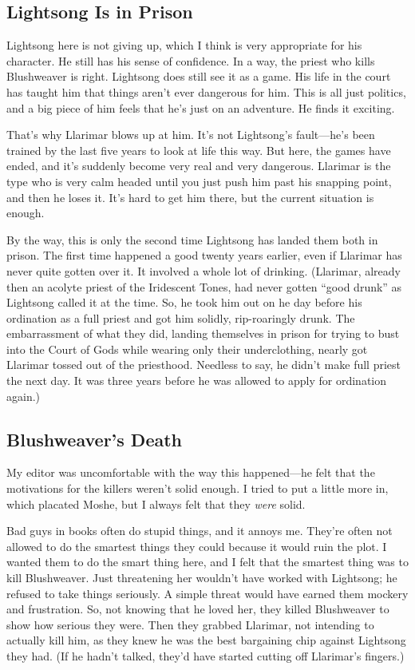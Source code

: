 \subsection*{Lightsong Is in Prison}

Lightsong here is not giving up, which I think is very appropriate for his character. He still has his sense of confidence. In a way, the priest who kills Blushweaver is right. Lightsong does still see it as a game. His life in the court has taught him that things aren’t ever dangerous for him. This is all just politics, and a big piece of him feels that he’s just on an adventure. He finds it exciting.

That’s why Llarimar blows up at him. It’s not Lightsong’s fault—he’s been trained by the last five years to look at life this way. But here, the games have ended, and it’s suddenly become very real and very dangerous. Llarimar is the type who is very calm headed until you just push him past his snapping point, and then he loses it. It’s hard to get him there, but the current situation is enough.

By the way, this is only the second time Lightsong has landed them both in prison. The first time happened a good twenty years earlier, even if Llarimar has never quite gotten over it. It involved a whole lot of drinking. (Llarimar, already then an acolyte priest of the Iridescent Tones, had never gotten “good drunk” as Lightsong called it at the time. So, he took him out on he day before his ordination as a full priest and got him solidly, rip-roaringly drunk. The embarrassment of what they did, landing themselves in prison for trying to bust into the Court of Gods while wearing only their underclothing, nearly got Llarimar tossed out of the priesthood. Needless to say, he didn’t make full priest the next day. It was three years before he was allowed to apply for ordination again.)

\subsection*{Blushweaver’s Death}

My editor was uncomfortable with the way this happened—he felt that the motivations for the killers weren’t solid enough. I tried to put a little more in, which placated Moshe, but I always felt that they \textit{were} solid.

Bad guys in books often do stupid things, and it annoys me. They’re often not allowed to do the smartest things they could because it would ruin the plot. I wanted them to do the smart thing here, and I felt that the smartest thing was to kill Blushweaver. Just threatening her wouldn’t have worked with Lightsong; he refused to take things seriously. A simple threat would have earned them mockery and frustration. So, not knowing that he loved her, they killed Blushweaver to show how serious they were. Then they grabbed Llarimar, not intending to actually kill him, as they knew he was the best bargaining chip against Lightsong they had. (If he hadn’t talked, they’d have started cutting off Llarimar’s fingers.)

